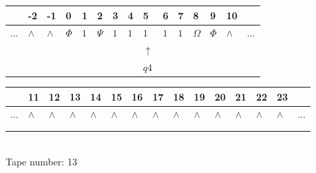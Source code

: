 \documentclass[11pt]{article}
\begin{document}
\begin{table}[H]
\centering
\begin{tabular}{lllllllllllllll}
 & -2 & -1 & 0 & 1 & 2 & 3 & 4 & 5 & 6 & 7 & 8 & 9 & 10 & \\
\hline
$...$ & \multicolumn{1}{|l|}{$\wedge$} & \multicolumn{1}{|l|}{$\wedge$} & \multicolumn{1}{|l|}{$\Phi$} & \multicolumn{1}{|l|}{$1$} & \multicolumn{1}{|l|}{$\Psi$} & \multicolumn{1}{|l|}{$1$} & \multicolumn{1}{|l|}{$1$} & \multicolumn{1}{|l|}{$1$} & \multicolumn{1}{|l|}{$1$} & \multicolumn{1}{|l|}{$1$} & \multicolumn{1}{|l|}{$\Omega$} & \multicolumn{1}{|l|}{$\Phi$} & \multicolumn{1}{|l|}{$\wedge$} & $...$\\
\hline
&  &  &  &  &  &  &  & $\uparrow$ &  &  &  &  &  &  \\
&  &  &  &  &  &  &  & $ q4 $ &  &  &  &  &  &  \\
\end{tabular}
\begin{tabular}{lllllllllllllll}
 & 11 & 12 & 13 & 14 & 15 & 16 & 17 & 18 & 19 & 20 & 21 & 22 & 23 & \\
\hline
$...$ & \multicolumn{1}{|l|}{$\wedge$} & \multicolumn{1}{|l|}{$\wedge$} & \multicolumn{1}{|l|}{$\wedge$} & \multicolumn{1}{|l|}{$\wedge$} & \multicolumn{1}{|l|}{$\wedge$} & \multicolumn{1}{|l|}{$\wedge$} & \multicolumn{1}{|l|}{$\wedge$} & \multicolumn{1}{|l|}{$\wedge$} & \multicolumn{1}{|l|}{$\wedge$} & \multicolumn{1}{|l|}{$\wedge$} & \multicolumn{1}{|l|}{$\wedge$} & \multicolumn{1}{|l|}{$\wedge$} & \multicolumn{1}{|l|}{$\wedge$} & $...$\\
\hline
&  &  &  &  &  &  &  &  &  &  &  &  &  &  \\
&  &  &  &  &  &  &  &  &  &  &  &  &  &  \\
\end{tabular}
\\
Tape number: 13
\noindent\makebox[\linewidth]{\hdashrule{\textwidth}{1pt}{1pt}}\end{table}
\end{document}
